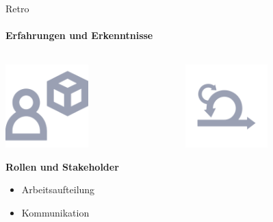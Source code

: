 \documentclass[
    ngerman,%
    authorontitle=true,
]{bfhbeamer}
\begin{document}
    \begin{frame}{Retro}
        \framesubtitle{Erfahrungen und Erkenntnisse}
        \begin{center}
            \begin{columns}

                \begin{column}{0.3\textwidth}
                    \center \includegraphics[width=0.5\textwidth]{assets/presentation/stakeholder}

                    \vspace{0.45cm}

                    \textbf{Rollen und Stakeholder}
                    \begin{itemize}
                        \item Arbeitsaufteilung
                        \item Kommunikation
                    \end{itemize}
                \end{column}

                \begin{column}{0.4\textwidth}
                    \center \includegraphics[width=0.5\textwidth]{assets/presentation/scrum}


\end{column}
\end{columns}
\end{center}
\end{frame}
\end{document}
